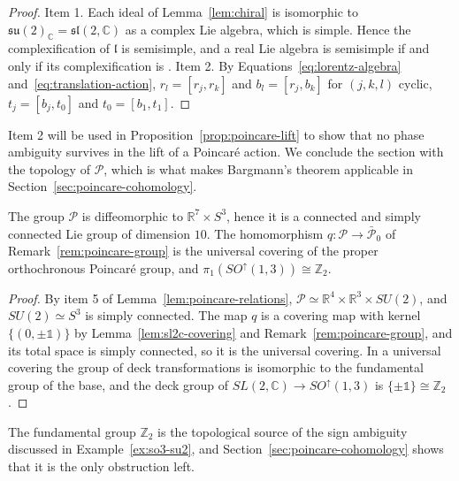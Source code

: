 	\begin{proof}
		Item 1. Each ideal of Lemma~\ref{lem:chiral} is isomorphic to $\mathfrak{su}(2)_{\mathbb{C}}=\mathfrak{sl}(2,\mathbb{C})$ as a complex Lie algebra, which is simple. Hence the complexification of $\mathfrak{l}$ is semisimple, and a real Lie algebra is semisimple if and only if its complexification is \cite[TODO-location]{TODO-Hum10}. Item 2. By Equations~\eqref{eq:lorentz-algebra} and~\eqref{eq:translation-action}, $r_l=[r_j,r_k]$ and $b_l=[r_j,b_k]$ for $(j,k,l)$ cyclic, $t_j=[b_j,t_0]$ and $t_0=[b_1,t_1]$.
	\end{proof}
	
	\noindent Item 2 will be used in Proposition~\ref{prop:poincare-lift} to show that no phase ambiguity survives in the lift of a Poincar\'e action. We conclude the section with the topology of $\mathcal{P}$, which is what makes Bargmann's theorem applicable in Section~\ref{sec:poincare-cohomology}.
	
	\begin{corollary}\label{cor:poincare-topology}
		The group $\mathcal{P}$ is diffeomorphic to $\mathbb{R}^7\times S^3$, hence it is a connected and simply connected Lie group of dimension $10$. The homomorphism $q:\mathcal{P}\to\bar{\mathcal{P}}_0$ of Remark~\ref{rem:poincare-group} is the universal covering of the proper orthochronous Poincar\'e group, and $\pi_1(SO^\uparrow(1,3))\cong\mathbb{Z}_2$.
	\end{corollary}
	
	\begin{proof}
		By item 5 of Lemma~\ref{lem:poincare-relations}, $\mathcal{P}\simeq\mathbb{R}^4\times\mathbb{R}^3\times SU(2)$, and $SU(2)\simeq S^3$ is simply connected. The map $q$ is a covering map with kernel $\{(0,\pm\mathbb{1})\}$ by Lemma~\ref{lem:sl2c-covering} and Remark~\ref{rem:poincare-group}, and its total space is simply connected, so it is the universal covering. In a universal covering the group of deck transformations is isomorphic to the fundamental group of the base, and the deck group of $SL(2,\mathbb{C})\to SO^\uparrow(1,3)$ is $\{\pm\mathbb{1}\}\cong\mathbb{Z}_2$.
	\end{proof}
	
	\noindent The fundamental group $\mathbb{Z}_2$ is the topological source of the sign ambiguity discussed in Example~\ref{ex:so3-su2}, and Section~\ref{sec:poincare-cohomology} shows that it is the only obstruction left.
	
